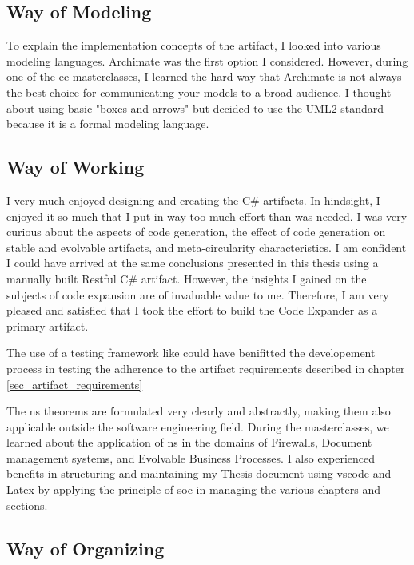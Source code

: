 \subsection{Way of Modeling}

To explain the implementation concepts of the artifact, I looked into various modeling
languages. Archimate was the first option I considered. However, during one of the \gls{ee}
masterclasses, I learned the hard way that Archimate is not always the best choice for
communicating your models to a broad audience. I thought about using basic "boxes and
arrows" but decided to use the UML2 standard because it is a formal modeling language.

\subsection{Way of Working}

I very much enjoyed designing and creating the C\# artifacts. In hindsight, I enjoyed it
so much that I put in way too much effort than was needed. I was very curious about the
aspects of code generation, the effect of code generation on stable and evolvable
artifacts, and meta-circularity characteristics. I am confident I could have arrived at
the same conclusions presented in this thesis using a manually built Restful C\# artifact.
However, the insights I gained on the subjects of code expansion are of invaluable value
to me. Therefore, I am very pleased and satisfied that I took the effort to build the Code
Expander as a primary artifact.

The use of a testing framework like 
\parencite*{github_archunitnet_2023} could have benifitted the developement process in
testing the adherence to the artifact requirements described in chapter
\ref{sec_artifact_requirements}

The \gls{ns} theorems are formulated very clearly and abstractly, making them also
applicable outside the software engineering field. During the masterclasses, we learned
about the application of \gls{ns} in the domains of Firewalls, Document management
systems, and Evolvable Business Processes. I also experienced benefits in structuring and
maintaining my Thesis document using \gls{vscode} and Latex by applying the principle of
\gls{soc} in managing the various chapters and sections. 

\subsection{Way of Organizing}

